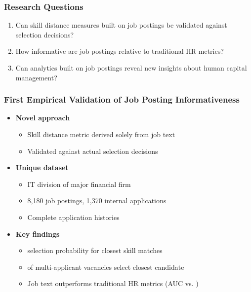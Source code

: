 \documentclass[aspectratio=169]{beamer}
\begin{document}
\begin{frame}
\frametitle{Research Questions}

\begin{enumerate}
\item Can skill distance measures built on job postings be validated against selection decisions?
\vspace{1em}

\item How informative are job postings relative to traditional HR metrics?
\vspace{1em}

\item Can analytics built on job postings reveal new insights about human capital management?
\end{enumerate}
\end{frame}


\begin{frame}
\frametitle{First Empirical Validation of Job Posting Informativeness}

\begin{itemize}
\item \textbf{Novel approach}
  \begin{itemize}
  \item Skill distance metric derived solely from job text
  \item Validated against actual selection decisions
  \end{itemize}
\vspace{0.5em}

\item \textbf{Unique dataset}
  \begin{itemize}
  \item IT division of major financial firm
  \item 8,180 job postings, 1,370 internal applications
  \item Complete application histories
  \end{itemize}
\vspace{0.5em}

\item \textbf{Key findings}
  \begin{itemize}
  \item {} selection probability for closest skill matches
  \item {} of multi-applicant vacancies select closest candidate
  \item Job text outperforms traditional HR metrics (AUC  vs. )
  \end{itemize}
\end{itemize}
\end{frame}
\end{document}
